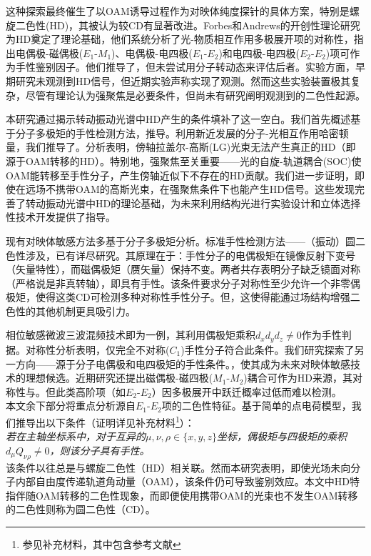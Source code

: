 \documentclass[reprint,aps,prl,twocolumn,superscriptaddress,groupedaddress]{revtex4-2}
\newcommand{\eomo}{$E_1$-$M_1$}
\newcommand{\eoet}{$E_1$-$E_2$}
\newcommand{\etet}{$E_2$-$E_2$}
\begin{document}
\begin{CJK*}{UTF8}{gbsn}
这种探索最终催生了以OAM诱导过程作为对映体纯度探针的具体方案，特别是螺旋二色性(HD)\cite{ANDREWS2004,Ye2019,Li2021}，其被认为较CD有显著改进\cite{Ye2019,Li2021}。Forbes和Andrews的开创性理论研究\cite{Forbes2018,Forbes2019,Forbes2021}为HD奠定了理论基础，他们系统分析了光-物质相互作用多极展开项的对称性，指出电偶极-磁偶极(\eomo)、电偶极-电四极(\eoet)和电四极-电四极(\etet)项可作为手性鉴别因子。他们推导了，但未尝试用分子转动态来评估后者。实验方面，早期研究未观测到HD信号\cite{Araoka2005,Loeffler2011}，但近期实验声称实现了观测\cite{Rusak2019,Zhang2020,Rouxel2022,Begin2023,Jain2023}。然而这些实验装置极其复杂，尽管有理论认为强聚焦是必要条件\cite{Forbes2019}，但尚未有研究阐明观测到的二色性起源。

本研究通过揭示转动振动光谱中HD产生的条件填补了这一空白。我们首先概述基于分子多极矩的手性检测方法，推导。利用新近发展的分子-光相互作用哈密顿量\cite{Maslov2024,Maslov_Thesis}，我们推导了。分析表明，傍轴拉盖尔-高斯(LG)光束无法产生真正的HD（即源于OAM转移的HD）。特别地，强聚焦至关重要——光的自旋-轨道耦合(SOC)\cite{Bliokh2015}使OAM能转移至手性分子，产生傍轴近似下不存在的HD贡献。我们进一步证明，即使在远场不携带OAM的高斯光束，在强聚焦条件下也能产生HD信号。这些发现完善了转动振动光谱中HD的理论基础，为未来利用结构光进行实验设计和立体选择性技术开发提供了指导。

现有对映体敏感方法多基于分子多极矩分析。标准手性检测方法——（振动）圆二色性涉及，已有详尽研究\cite{Stephens1985,BUCKINGHAM1987,Mun2019,Lovesey2019}。其原理在于：手性分子的电偶极矩在镜像反射下变号（矢量特性），而磁偶极矩（赝矢量）保持不变。两者共存表明分子缺乏镜面对称（严格说是非真转轴），即具有手性。该条件要求分子对称性至少允许一个非零偶极矩，使得这类CD可检测多种对称性手性分子。但，这使得能通过场结构增强二色性的其他机制更具吸引力。

相位敏感微波三波混频技术\cite{Patterson2013,Patterson2013PRL}即为一例，其利用偶极矩乘积$d_xd_yd_z\neq 0$作为手性判据\cite{Patterson2013,Ordonez2018,Ayuso2022}。对称性分析表明，仅完全不对称($C_1$)手性分子符合此条件。我们研究探索了另一方向——源于分子电偶极和电四极矩的手性条件。，使其成为未来对映体敏感技术的理想候选。近期研究还提出磁偶极-磁四极($M_1$-$M_2$)耦合可作为HD来源，其对称性与\cite{Ji2024}。但此类高阶项（如\etet）因多极展开中跃迁概率过低而难以检测。\\
本文余下部分将重点分析源自\eoet 项的二色性特征。基于简单的点电荷模型，我们推导出以下条件（证明详见补充材料\footnote{参见补充材料，其中包含参考文献\cite{Maslov2024,Maslov_Thesis,Lax1975,Bliokh2015,Bliokh2023}}）：\\
\textit{若在主轴坐标系中，对于互异的$\mu, \nu, \rho \in \{x,y,z\}$坐标，偶极矩与四极矩的乘积$d_{\mu}Q_{\nu \rho} \neq 0$，则该分子具有手性。}\\
该条件以往总是与螺旋二色性（HD）相关联\cite{ANDREWS2004,Forbes2018}。然而本研究表明，即使光场未向分子内部自由度传递轨道角动量（OAM），该条件仍可导致鉴别效应。本文中HD特指伴随OAM转移的二色性现象，而即便使用携带OAM的光束也不发生OAM转移的二色性则称为圆二色性（CD）。


\end{CJK*}
\end{document}

